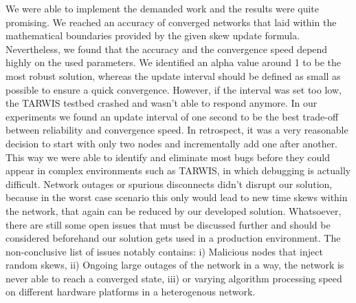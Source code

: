 \documentclass{llncs}
\begin{document}
	We were able to implement the demanded work and the results were quite promising. We reached an accuracy of converged networks that laid within the mathematical boundaries provided by the given skew update formula. Nevertheless, we found that the accuracy and the convergence speed depend highly on the used parameters. We identified an alpha value around 1 to be the most robust solution, whereas the update interval should be defined as small as possible to ensure a quick convergence. However, if the interval was set too low, the TARWIS testbed crashed and wasn't able to respond anymore. In our experiments we found an update interval of one second to be the best trade-off between reliability and convergence speed. In retrospect, it was a very reasonable decision to start with only two nodes and incrementally add one after another. This way we were able to identify and eliminate most bugs before they could appear in complex environments such as TARWIS, in which debugging is actually difficult. Network outages or spurious disconnects didn't disrupt our solution, because in the worst case scenario this only would lead to new time skews within the network, that again can be reduced by our developed solution. Whatsoever, there are still some open issues that must be discussed further and should be considered beforehand our solution gets used in a production environment. The non-conclusive list of issues notably contains: i) Malicious nodes that inject random skews, ii) Ongoing large outages of the network in a way, the network is never able to reach a converged state, iii) or varying algorithm processing speed on different hardware platforms in a heterogenous network.
	
	{}
	
	
	
	
	
\end{document}
